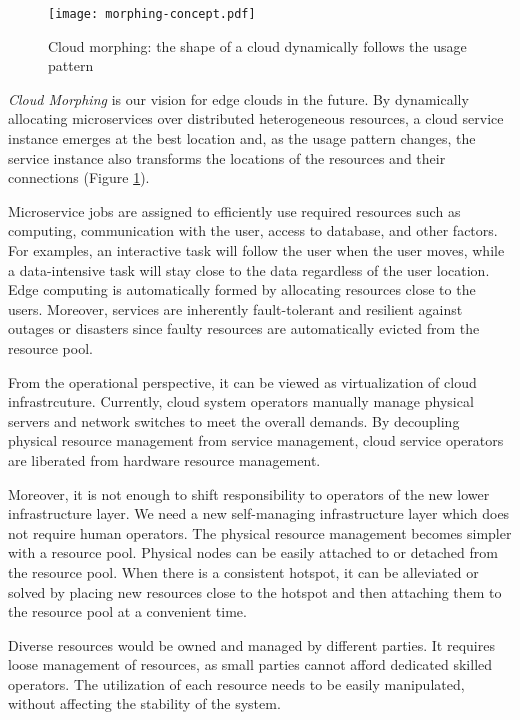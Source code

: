 \begin{figure}[tb]
  \begin{center}
    \texttt{[image: morphing-concept.pdf]}
    \vspace{-2.0ex}
    \caption{Cloud morphing: the shape of a cloud dynamically follows the
      usage pattern}
    \label{fig:concept}
  \end{center}
\end{figure}

{\em Cloud Morphing} is our vision for edge clouds in the future.
By dynamically allocating microservices over distributed
heterogeneous resources, a cloud service instance emerges at the best
location and, as the usage pattern changes, the service instance also
transforms the locations of the resources and their connections
(Figure \ref{fig:concept}).

Microservice jobs are assigned to efficiently use required resources
such as computing, communication with the user, access to
database, and other factors.
For examples, an interactive task will follow the user when the user
moves, while a data-intensive task will stay close to the data
regardless of the user location.
Edge computing is automatically formed by allocating resources close to
the users.
Moreover, services are inherently fault-tolerant and resilient
against outages or disasters since faulty resources are
automatically evicted from the resource pool.

From the operational perspective, it can be viewed as virtualization
of cloud infrastrcuture.
Currently, cloud system operators manually manage physical servers and
network switches to meet the overall demands.
By decoupling physical resource management from service management,
cloud service operators are liberated from hardware resource management.

Moreover, it is not enough to shift responsibility to operators of the
new lower infrastructure layer. We need a new self-managing
infrastructure layer which does not require human operators.
The physical resource management becomes simpler with a resource pool.
Physical nodes can be easily attached to or detached from the resource pool.
When there is a consistent hotspot, it can be alleviated or solved by
placing new resources close to the hotspot and then attaching them to
the resource pool at a convenient time.

Diverse resources would be owned and managed by different parties.
It requires loose management of resources, as small parties cannot
afford dedicated skilled operators.
The utilization of each resource needs to be easily manipulated,
without affecting the stability of the system.

